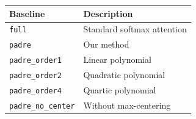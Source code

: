 \begin{table}[H]
\centering
\small
\begin{tabular}{ll}
\toprule
\textbf{Baseline} & \textbf{Description} \\
\midrule
\texttt{full} & Standard softmax attention \\
\texttt{padre} & Our method \\
\texttt{padre\_order1} & Linear polynomial \\
\texttt{padre\_order2} & Quadratic polynomial \\
\texttt{padre\_order4} & Quartic polynomial \\
\texttt{padre\_no\_center} & Without max-centering \\
\bottomrule
\end{tabular}
\end{table}

